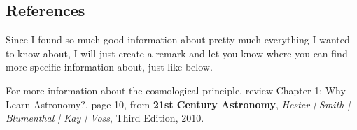 \subsection{References}

Since I found so much good information about pretty much everything I wanted to know about, I will just create a remark and let you know where you can find more specific information about, just like below.

\begin{remark}
For more information about the cosmological principle, review Chapter 1: Why Learn Astronomy?, page 10, from \textbf{21st Century Astronomy}, \textit{Hester | Smith | Blumenthal | Kay | Voss}, Third Edition, 2010.
\end{remark}


